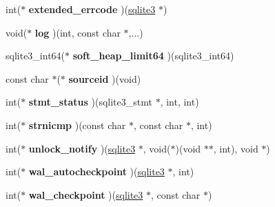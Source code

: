 \begin{DoxyCompactItemize}
\item 
\hypertarget{structsqlite3__api__routines_abc8b842c381e74bd6880f49df71ec395}{int($\ast$ {\bfseries extended\-\_\-errcode} )(\hyperlink{structsqlite3}{sqlite3} $\ast$)}\label{structsqlite3__api__routines_abc8b842c381e74bd6880f49df71ec395}

\item 
\hypertarget{structsqlite3__api__routines_ab7e50803433fe04a73e581b0c293f417}{void($\ast$ {\bfseries log} )(int, const char $\ast$,...)}\label{structsqlite3__api__routines_ab7e50803433fe04a73e581b0c293f417}

\item 
\hypertarget{structsqlite3__api__routines_a823e82c8ced7470846ff94857b67c1f0}{sqlite3\-\_\-int64($\ast$ {\bfseries soft\-\_\-heap\-\_\-limit64} )(sqlite3\-\_\-int64)}\label{structsqlite3__api__routines_a823e82c8ced7470846ff94857b67c1f0}

\item 
\hypertarget{structsqlite3__api__routines_a0f98ac98b5dc72f7910103f7cc861c96}{const char $\ast$($\ast$ {\bfseries sourceid} )(void)}\label{structsqlite3__api__routines_a0f98ac98b5dc72f7910103f7cc861c96}

\item 
\hypertarget{structsqlite3__api__routines_a965fb4dd8b649c8192bcdb436ea8ee4c}{int($\ast$ {\bfseries stmt\-\_\-status} )(sqlite3\-\_\-stmt $\ast$, int, int)}\label{structsqlite3__api__routines_a965fb4dd8b649c8192bcdb436ea8ee4c}

\item 
\hypertarget{structsqlite3__api__routines_a1ca0d03d2340d21b5f1d2d6b60651e5c}{int($\ast$ {\bfseries strnicmp} )(const char $\ast$, const char $\ast$, int)}\label{structsqlite3__api__routines_a1ca0d03d2340d21b5f1d2d6b60651e5c}

\item 
\hypertarget{structsqlite3__api__routines_aad63fcc63d8102991ba13bcb23d3d42c}{int($\ast$ {\bfseries unlock\-\_\-notify} )(\hyperlink{structsqlite3}{sqlite3} $\ast$, void($\ast$)(void $\ast$$\ast$, int), void $\ast$)}\label{structsqlite3__api__routines_aad63fcc63d8102991ba13bcb23d3d42c}

\item 
\hypertarget{structsqlite3__api__routines_a6f9743cc31d029be8a765529bc693552}{int($\ast$ {\bfseries wal\-\_\-autocheckpoint} )(\hyperlink{structsqlite3}{sqlite3} $\ast$, int)}\label{structsqlite3__api__routines_a6f9743cc31d029be8a765529bc693552}

\item 
\hypertarget{structsqlite3__api__routines_a8161479d3298a910a21e9d6dd92e1083}{int($\ast$ {\bfseries wal\-\_\-checkpoint} )(\hyperlink{structsqlite3}{sqlite3} $\ast$, const char $\ast$)}\label{structsqlite3__api__routines_a8161479d3298a910a21e9d6dd92e1083}


\end{DoxyCompactItemize}
